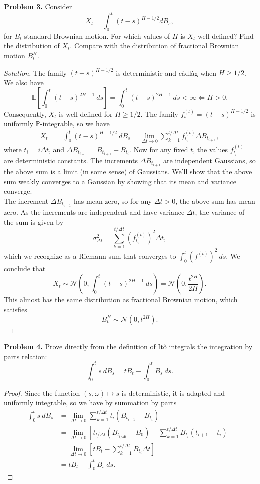 \documentclass[11pt,letterpaper]{report}
\newcommand{\mcal}[1]{\mathcal{#1}}
\newcommand{\E}{\mathbb{E}}
\newcommand{\Prob}{\mathbb{P}}
\newenvironment{solution}
{\begin{proof}[Solution]}
{\end{proof}}
\begin{document}
\noindent\textbf{Problem 3. }
Consider
\[
X_t = \int_0^t(t-s)^{H-1/2}dB_s,
\]
for $B_t$ standard Brownian motion. For which values of $H$ is $X_t$ well defined? Find the distribution of $X_t$. Compare with the distribution of fractional Brownian motion $B^H_t$.
\begin{solution}
	The family $(t-s)^{H-1/2}$ is deterministic and c\`adl\`ag when $H\geq 1/2$. We also have
	\[
	\E\left[\int_0^t(t-s)^{2H-1}\ ds\right] = \int_0^t(t-s)^{2H-1}\ ds < \infty \iff H>0.
	\]
	Consequently, $X_t$ is well defined for $H\geq 1/2$. The family $f^{(t)}_s = (t-s)^{H-1/2}$ is uniformly $\Prob$-integrable, so we have
	\begin{align*}
	X_t &= \int_0^t(t-s)^{H-1/2}\ dB_s= \lim_{\Delta t\to 0}\sum_{k=1}^{t/\Delta t}f^{(t)}_{t_i}\Delta B_{t_{i+1}},
	\end{align*}
	where $t_i = i\Delta t$, and $\Delta B_{t_{i+1}} = B_{t_{i+1}}-B_{t_i}$. Now for any fixed $t$, the values $f^{(t)}_{t_i}$ are deterministic constants. The increments $\Delta B_{t_{i+1}}$ are independent Gaussians, so the above sum is a limit (in some sense) of Gaussians. We'll show that the above sum weakly converges to a Gaussian by showing that its mean and variance converge.\\

	\noindent The increment $\Delta B_{t_{i+1}}$ has mean zero, so for any $\Delta t>0$, the above sum has mean zero. As the increments are independent and have variance $\Delta t$, the variance of the sum is given by
	\[
	\sigma_{\Delta t}^2 = \sum_{k=1}^{t/\Delta t}\left(f_{t_i}^{(t)}\right)^2\Delta t,
	\]
	which we recognize as a Riemann sum that converges to $\int_0^t(f^{(t)})^2\ ds$. We conclude that
	\[
	X_t \sim \mcal{N}\left(0, \int_0^t(t-s)^{2H-1}\ ds\right) = \mcal{N}\left(0, \frac{t^{2H}}{2H}\right).
	\]
	This almost has the same distribution as fractional Brownian motion, which satisfies
	\[
	B^H_t\sim \mcal{N}(0, t^{2H}).
	\]
\end{solution}

\noindent\textbf{Problem 4. }
Prove directly from the definition of It\^o integrals the integration by parts relation:
\[
\int_0^ts\ dB_s = tB_t - \int_0^tB_s\ ds.
\]
\begin{proof}
	Since the function $(s, \omega)\mapsto s$ is deterministic, it is adapted and uniformly integrable, so we have by summation by parts
	\begin{align*}
		\int_0^t s\ dB_s&= \lim_{\Delta t\to 0}\sum_{k=1}^{t/\Delta t}t_i(B_{t_{i+1}}-B_{t_i})\\
		&= \lim_{\Delta t\to 0}\left[t_{t/\Delta t}(B_{t_{t/\Delta t}}-B_0) - \sum_{k=1}^{t/\Delta t}B_{t_i}(t_{i+1}-t_i)\right]\\
		&= \lim_{\Delta t\to 0}\left[tB_t - \sum_{k=1}^{t/\Delta t}B_{t_i}\Delta t\right]\\
		&= tB_t - \int_0^tB_s\ ds.
	\end{align*}
\end{proof}
\end{document}
